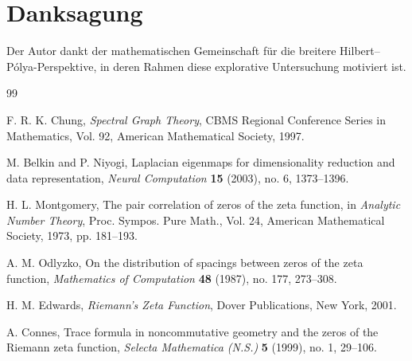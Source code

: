\documentclass[11pt,a4paper,draft]{article}
\begin{document}
	\section*{Danksagung}
	
	Der Autor dankt der mathematischen Gemeinschaft für die breitere Hilbert--Pólya-Perspektive, in deren Rahmen diese explorative Untersuchung motiviert ist.
	
	\begin{thebibliography}{99}
		
		F. R. K. Chung,
		\emph{Spectral Graph Theory},
		CBMS Regional Conference Series in Mathematics, Vol. 92,
		American Mathematical Society, 1997.
		
		M. Belkin and P. Niyogi,
		Laplacian eigenmaps for dimensionality reduction and data representation,
		\emph{Neural Computation} \textbf{15} (2003), no. 6, 1373--1396.
		
		H. L. Montgomery,
		The pair correlation of zeros of the zeta function,
		in \emph{Analytic Number Theory},
		Proc. Sympos. Pure Math., Vol. 24,
		American Mathematical Society, 1973, pp. 181--193.
		
		A. M. Odlyzko,
		On the distribution of spacings between zeros of the zeta function,
		\emph{Mathematics of Computation} \textbf{48} (1987), no. 177, 273--308.
		
		H. M. Edwards,
		\emph{Riemann's Zeta Function},
		Dover Publications, New York, 2001.
		
		A. Connes,
		Trace formula in noncommutative geometry and the zeros of the Riemann zeta function,
		\emph{Selecta Mathematica (N.S.)} \textbf{5} (1999), no. 1, 29--106.
		
	\end{thebibliography}
	
\end{document}
